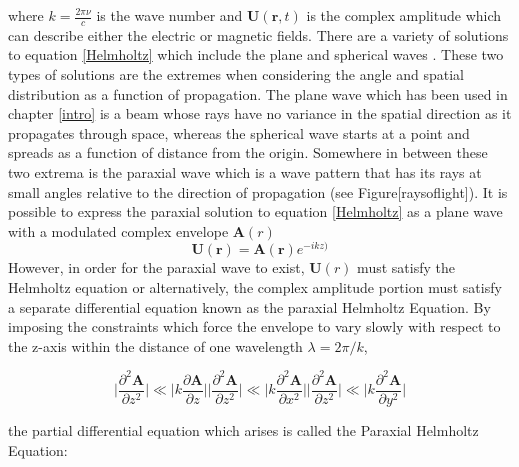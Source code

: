 		
		where $k=\frac{2\pi\nu}{c}$ is the wave number and $\mathbf{U}(\mathbf{r},t)$ is the complex amplitude which can describe either the electric or magnetic fields.  There are a variety of solutions to equation \ref{Helmholtz} which include the plane and spherical waves \cite{Saleh}.  These two types of solutions are the extremes when considering the angle and spatial distribution as a function of propagation.  The plane wave which has been used in chapter \ref{intro} is a beam whose rays have no variance in the spatial direction as it propagates through space, whereas the spherical wave starts at a point and spreads as a function of distance from the origin. Somewhere in between these two extrema is the paraxial wave which is a wave pattern that has its rays at small angles relative to the direction of propagation (see Figure[raysoflight]).  It is possible to express the paraxial solution to equation \ref{Helmholtz} as a plane wave with a modulated complex envelope $\mathbf{A}(r)$
		\begin{equation}
		\mathbf{U}(\mathbf{r}) = \mathbf{A}(\mathbf{r}) e^{-ikz)}
		\end{equation}
		However, in order for the paraxial wave to exist, $\mathbf{U}(r)$ must satisfy the Helmholtz equation or alternatively, the complex amplitude portion must satisfy a separate differential equation known as the paraxial Helmholtz Equation. By imposing the constraints which force the envelope to vary slowly with respect to the z-axis within the distance of one wavelength $\lambda = 2\pi/k$,

		\begin{subequations}
		\begin{equation}\label{paraxiala}
		\bigg| { \frac{\partial^2 \mathbf{A}}{\partial z^2} } \bigg|  \ll  \bigg| { k {\frac{\partial\mathbf{A}}{{\partial z}} } } \bigg|
		\end{equation}
		\begin{equation}\label{paraxialb}
		\bigg| { \frac{\partial^2 \mathbf{A}}{\partial z^2} } \bigg|  \ll  \bigg| { k {\frac{\partial^2 \mathbf{A}}{\partial x^2}} } \bigg|
		\end{equation}
		\begin{equation}\label{paraxialc}
		\bigg| { \frac{\partial^2 \mathbf{A}}{\partial z^2} } \bigg|  \ll  \bigg| { k{\frac{\partial^2 \mathbf{A}}{\partial y^2}}} \bigg|
		\end{equation}
		\end{subequations}
		
		the partial differential equation which arises is called the Paraxial Helmholtz Equation:
		
